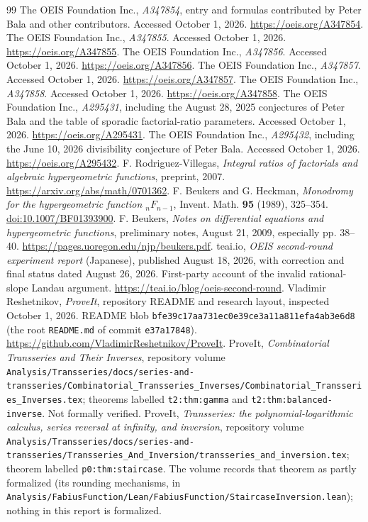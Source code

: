 \documentclass[11pt]{article}
\theoremstyle{definition}
\theoremstyle{remark}
\begin{document}
\begin{thebibliography}{99}
The OEIS Foundation Inc., \emph{A347854}, entry and formulas contributed by
Peter Bala and other contributors. Accessed October 1, 2026.
\url{https://oeis.org/A347854}.
The OEIS Foundation Inc., \emph{A347855}. Accessed October 1, 2026.
\url{https://oeis.org/A347855}.
The OEIS Foundation Inc., \emph{A347856}. Accessed October 1, 2026.
\url{https://oeis.org/A347856}.
The OEIS Foundation Inc., \emph{A347857}. Accessed October 1, 2026.
\url{https://oeis.org/A347857}.
The OEIS Foundation Inc., \emph{A347858}. Accessed October 1, 2026.
\url{https://oeis.org/A347858}.
The OEIS Foundation Inc., \emph{A295431}, including the August 28, 2025
conjectures of Peter Bala and the table of sporadic factorial-ratio parameters.
Accessed October 1, 2026. \url{https://oeis.org/A295431}.
The OEIS Foundation Inc., \emph{A295432}, including the June 10, 2026
divisibility conjecture of Peter Bala. Accessed October 1, 2026.
\url{https://oeis.org/A295432}.
F. Rodriguez-Villegas, \emph{Integral ratios of factorials and algebraic
hypergeometric functions}, preprint, 2007.
\url{https://arxiv.org/abs/math/0701362}.
F. Beukers and G. Heckman, \emph{Monodromy for the hypergeometric function
${}_nF_{n-1}$}, Invent. Math. \textbf{95} (1989), 325--354.
\href{https://doi.org/10.1007/BF01393900}{doi:10.1007/BF01393900}.
F. Beukers, \emph{Notes on differential equations and hypergeometric
functions}, preliminary notes, August 21, 2009, especially pp. 38--40.
\url{https://pages.uoregon.edu/njp/beukers.pdf}.
teai.io, \emph{OEIS second-round experiment report} (Japanese),
published August 18, 2026, with correction and final status dated August 26,
2026. First-party account of the invalid rational-slope Landau argument.
\url{https://teai.io/blog/oeis-second-round}.
Vladimir Reshetnikov, \emph{ProveIt}, repository README and research layout,
inspected October 1, 2026. README blob
\texttt{bfe39c17aa731ec0e39ce3a11a811efa4ab3e6d8} (the root \texttt{README.md}
of commit \texttt{e37a17848}).
\url{https://github.com/VladimirReshetnikov/ProveIt}.
ProveIt, \emph{Combinatorial Transseries and Their Inverses}, repository
volume \nolinkurl{Analysis/Transseries/docs/series-and-transseries/Combinatorial_Transseries_Inverses/Combinatorial_Transseries_Inverses.tex};
theorems labelled \texttt{t2:thm:gamma} and \texttt{t2:thm:balanced-inverse}.
Not formally verified.
ProveIt, \emph{Transseries: the polynomial-logarithmic calculus, series
reversal at infinity, and inversion}, repository volume
\nolinkurl{Analysis/Transseries/docs/series-and-transseries/Transseries_And_Inversion/transseries_and_inversion.tex};
theorem labelled \texttt{p0:thm:staircase}. The volume records that theorem
as partly formalized (its rounding mechanisms, in
\nolinkurl{Analysis/FabiusFunction/Lean/FabiusFunction/StaircaseInversion.lean});
nothing in this report is formalized.
\end{thebibliography}
\end{document}
